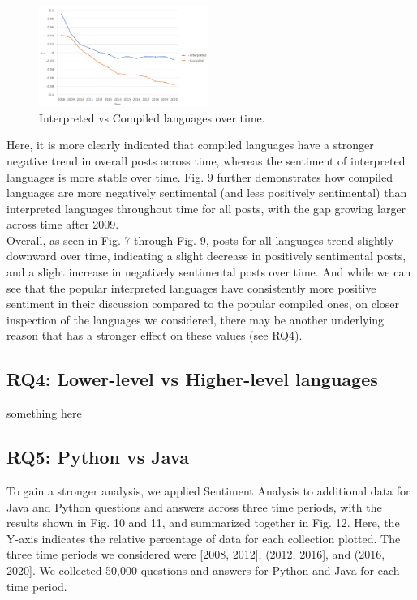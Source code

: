 \documentclass[conference]{IEEEtran}
\begin{document}
\begin{figure}[htbp]
\centerline{\includegraphics[width=0.49\textwidth]{figures/time_interpreted_compiled.png}}
\caption{Interpreted vs Compiled languages over time.}
\label{fig}
\end{figure}

Here, it is more clearly indicated that compiled languages have a stronger negative trend in overall posts across time, whereas the sentiment of interpreted languages is more stable over time. Fig. 9 further demonstrates how compiled languages are more negatively sentimental (and less positively sentimental) than interpreted languages throughout time for all posts, with the gap growing larger across time after 2009. \\

Overall, as seen in Fig. 7 through Fig. 9, posts for all languages trend slightly downward over time, indicating a slight decrease in positively sentimental posts, and a slight increase in negatively sentimental posts over time. And while we can see that the popular interpreted languages have consistently more positive sentiment in their discussion compared to the popular compiled ones, on closer inspection of the languages we considered, there may be another underlying reason that has a stronger effect on these values (see RQ4). \\

\subsection{RQ4: Lower-level vs Higher-level languages}
something here

\subsection{RQ5: Python vs Java}
To gain a stronger analysis, we applied Sentiment Analysis to additional data for Java and Python questions and answers across three time periods, with the results shown in Fig. 10 and 11, and summarized together in Fig. 12. Here, the Y-axis indicates the relative percentage of data for each collection plotted. The three time periods we considered were [2008, 2012], (2012, 2016], and (2016, 2020]. We collected 50,000 questions and answers for Python and Java for each time period. 
\end{document}
